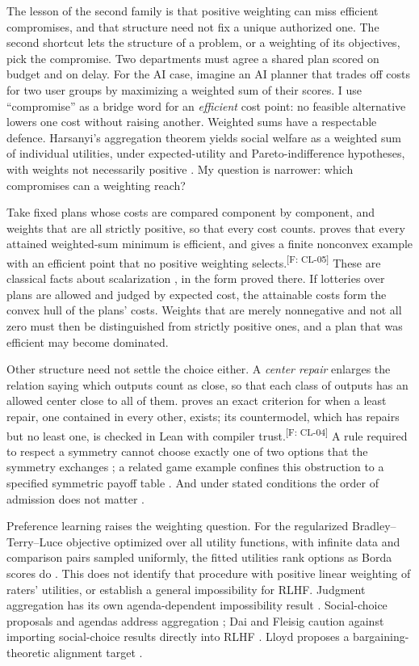 \documentclass[pdflatex,sn-basic]{sn-jnl}%
\newcommand{\slot}[1]{}%
\newcommand{\claim}[2]{\ifannotated\textsuperscript{\textcolor{blue!60!black}{\tiny[#1: #2]}}\fi}
\newcommand{\enquote}[1]{``#1''}
\begin{document}
\slot{5.2}
The lesson of the second family is that positive weighting can miss efficient compromises, and that structure need not fix a unique authorized one. The second shortcut lets the structure of a problem, or a weighting of its objectives, pick the compromise. Two departments must agree a shared plan scored on budget and on delay. For the AI case, imagine an AI planner that trades off costs for two user groups by maximizing a weighted sum of their scores. I use \enquote{compromise} as a bridge word for an \emph{efficient} cost point: no feasible alternative lowers one cost without raising another. Weighted sums have a respectable defence. Harsanyi's aggregation theorem yields social welfare as a weighted sum of individual utilities, under expected-utility and Pareto-indifference hypotheses, with weights not necessarily positive \citep[\S III]{harsanyi1955}. My question is narrower: which compromises can a weighting reach?

Take fixed plans whose costs are compared component by component, and weights that are all strictly positive, so that every cost counts. \citet{tsiokos2026v6} proves that every attained weighted-sum minimum is efficient, and gives a finite nonconvex example with an efficient point that no positive weighting selects.\claim{F}{CL-05} These are classical facts about scalarization \citep{ehrgott2005}, in the form proved there. If lotteries over plans are allowed and judged by expected cost, the attainable costs form the convex hull of the plans' costs. Weights that are merely nonnegative and not all zero must then be distinguished from strictly positive ones, and a plan that was efficient may become dominated.

Other structure need not settle the choice either. A \emph{center repair} enlarges the relation saying which outputs count as close, so that each class of outputs has an allowed center close to all of them. \citet{tsiokos2026v4} proves an exact criterion for when a least repair, one contained in every other, exists; its countermodel, which has repairs but no least one, is checked in Lean with compiler trust.\claim{F}{CL-04} A rule required to respect a symmetry cannot choose exactly one of two options that the symmetry exchanges \citep{tsiokos2026f4}; a related game example confines this obstruction to a specified symmetric payoff table \citep{tsiokos2026institutions}. And under stated conditions the order of admission does not matter \citep{tsiokos2026f7}.

Preference learning raises the weighting question. For the regularized Bradley--Terry--Luce objective optimized over all utility functions, with infinite data and comparison pairs sampled uniformly, the fitted utilities rank options as Borda scores do \citep{siththaranjan2024}. This does not identify that procedure with positive linear weighting of raters' utilities, or establish a general impossibility for RLHF. Judgment aggregation has its own agenda-dependent impossibility result \citep{list2002}. Social-choice proposals and agendas address aggregation \citep{prasad2018,conitzer2024,ge2024,fish2026}; Dai and Fleisig caution against importing social-choice results directly into RLHF \citep{dai2024}. Lloyd proposes a bargaining-theoretic alignment target \citep{lloyd2025}.
\end{document}
